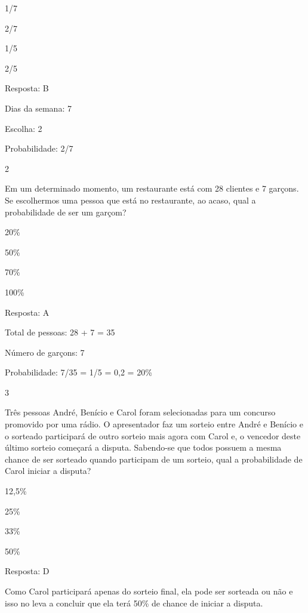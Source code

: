 \begin{escolha}
\begin{escolha}
\item
  1/7
\item
  2/7
\item
  1/5
\item
  2/5
\end{escolha}

Resposta: B

Dias da semana: 7

Escolha: 2

Probabilidade: 2/7

\num{2}

Em um determinado momento, um restaurante está com 28 clientes e 7
garçons. Se escolhermos uma pessoa que está no restaurante, ao acaso,
qual a probabilidade de ser um garçom?

\begin{escolha}
\item
  20\%
\item
  50\%
\item
  70\%
\item
  100\%
\end{escolha}

Resposta: A

Total de pessoas: 28 + 7 = 35

Número de garçons: 7

Probabilidade: 7/35 = 1/5 = 0,2 = 20\%

\num{3}

Três pessoas André, Benício e Carol foram selecionadas para um concurso
promovido por uma rádio. O apresentador faz um sorteio entre André e
Benício e o sorteado participará de outro sorteio mais agora com Carol
e, o vencedor deste último sorteio começará a disputa. Sabendo-se que
todos possuem a mesma chance de ser sorteado quando participam de um
sorteio, qual a probabilidade de Carol iniciar a disputa?

\begin{escolha}
\item
  12,5\%
\item
  25\%
\item
  33\%
\item
  50\%
\end{escolha}

Resposta: D

Como Carol participará apenas do sorteio final, ela pode ser sorteada ou
não e isso no leva a concluir que ela terá 50\% de chance de iniciar a
disputa.

\chapter{}


\end{escolha}
